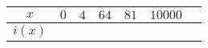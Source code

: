 {\begin{multicols}{2}
\begin{center}
\end{center}
	\begin{center}
\begin{tabular}{|c|c|c|c|c|c|c|}
	\hline
	\cellcolor{gray!40} $x$& $0$ & $4$ & $64$&$81$&$10000$\\
	\hline
	\cellcolor{gray!40} $i(x)$&\hspace{0.9cm}\phantom{t}&\hspace{0.9cm}\phantom{t}&\hspace{0.9cm}\phantom{t}&\hspace{0.9cm}\phantom{t} &\hspace{0.9cm}\phantom{t} \\
	\hline
\end{tabular}
\end{center}
\endgroup
    \end{multicols}

}

